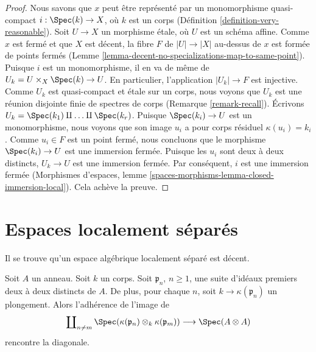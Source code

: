 \begin{proof}
Nous savons que $x$ peut être représenté par un monomorphisme quasi-compact
$i : \Spec(k) \to X$, où $k$ est un corps
(Définition \ref{definition-very-reasonable}).
Soit $U \to X$ un morphisme étale, où $U$ est un schéma affine.
Comme $x$ est fermé et que $X$ est décent, la fibre $F$ de
$|U| \to |X|$ au-dessus de $x$ est formée de points fermés
(Lemme \ref{lemma-decent-no-specializations-map-to-same-point}).
Puisque $i$ est un monomorphisme, il en va de même de
$U_k = U \times_X \Spec(k) \to U$. En particulier, l'application
$|U_k| \to F$ est injective. Comme $U_k$ est quasi-compact et étale sur un
corps, nous voyons que $U_k$ est une réunion disjointe finie de spectres de
corps (Remarque \ref{remark-recall}). Écrivons
$U_k = \Spec(k_1) \amalg \ldots \amalg \Spec(k_r)$.
Puisque $\Spec(k_i) \to U$ est un monomorphisme, nous voyons que son image
$u_i$ a pour corps résiduel $\kappa(u_i) = k_i$.
Comme $u_i \in F$ est un point fermé, nous concluons que le morphisme
$\Spec(k_i) \to U$ est une immersion fermée. Puisque les $u_i$ sont deux à
deux distincts, $U_k \to U$ est une immersion fermée. Par conséquent, $i$
est une immersion fermée (Morphismes d'espaces, lemme
\ref{spaces-morphisms-lemma-closed-immersion-local}). Cela achève la preuve.
\end{proof}


\section{Espaces localement séparés}
\label{section-locally-separated}

\noindent
Il se trouve qu'un espace algébrique localement séparé est décent.

\begin{lemma}
\label{lemma-infinite-number}
Soit $A$ un anneau. Soit $k$ un corps. Soit $\mathfrak p_n$, $n \geq 1$,
une suite d'idéaux premiers deux à deux distincts de $A$. De plus, pour chaque
$n$, soit $k \to \kappa(\mathfrak p_n)$ un plongement. Alors l'adhérence
de l'image de
$$
\coprod\nolimits_{n \not = m}
\Spec(\kappa(\mathfrak p_n) \otimes_k \kappa(\mathfrak p_m))
\longrightarrow
\Spec(A \otimes A)
$$
rencontre la diagonale.
\end{lemma}


